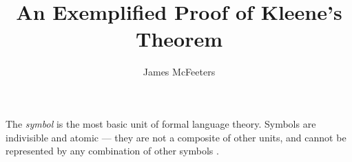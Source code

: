 \documentclass{bcthesis}
\title{An Exemplified Proof of Kleene's Theorem}
\author{James McFeeters}
\newif\ifbuildfrontmatter
\renewcommand{\meo}[1]{}
\newcommand{\footcite}[2]{\xspace\cite[pg.~{#2}]{#1}\xspace}
\begin{document}
\ifbuildfrontmatter
\frontmatter

	\maketitle

	\begin{abstract}
		\meo{This is a placeholder abstract!}

		This paper provides a proof of Kleene's Theorem accompanied by definitions and examples for newcomers to formal language theory.

		Kleene's theorem is a result from formal language theory that provides the mathematical foundation for ubiquitous regular expression search programs.
		Regular expression string matching can be found in a wide variety of software, from compilers to word processors. 
		The speed and power of regular expression string matching are direct results of the relationship between the regular languages and finite automata established by this theorem.
		

		\meo{This is a placeholder abstract!}
	\end{abstract}


	\begin{acknowledgments}
		I thank Darrah Chavey for his capable advising and for introducing me to the topic.
		I thank Cameron Kuchta for proofreading my paper, and Simon Tomlinson for proofreading my paper and assisting me in writing the program used to produce examples.
	\end{acknowledgments}

	\tableofcontents
\fi

\mainmatter

\label{ch:basics}

		\begin{definition}[Symbol]
			The \textit{symbol} is the most basic unit of formal language theory.
			Symbols are indivisible and atomic --- they are not a composite of other units, and cannot be represented by any combination of other symbols \footcite{hopcroft}{1}.
		\end{definition}
\end{document}
